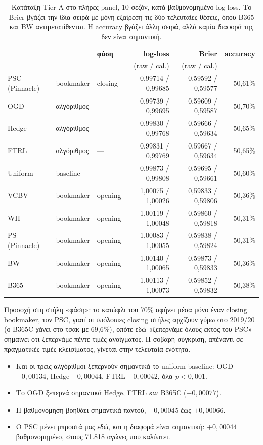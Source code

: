 \documentclass[11pt,a4paper]{article}
\renewcommand{\_}{\oldunderscore\allowbreak}
\begin{document}
\begin{table}[H]
\centering
\small
\begin{tabular}{@{}lllrrr@{}}
\toprule
& & \textbf{φάση} & \textbf{log-loss} & \textbf{Brier} & \textbf{accuracy} \\
& & & (raw / cal.) & (raw / cal.) & \\
\midrule
PSC (Pinnacle) & bookmaker & closing & 0,99714 / 0,99685 & 0,59592 / 0,59577 & 50,61\% \\
OGD            & αλγόριθμος & ---    & 0,99739 / 0,99695 & 0,59609 / 0,59587 & 50,70\% \\
Hedge          & αλγόριθμος & ---    & 0,99830 / 0,99768 & 0,59666 / 0,59634 & 50,65\% \\
FTRL           & αλγόριθμος & ---    & 0,99831 / 0,99769 & 0,59667 / 0,59634 & 50,65\% \\
Uniform        & baseline   & ---    & 0,99873 / 0,99808 & 0,59695 / 0,59661 & 50,60\% \\
VC\_BV         & bookmaker & opening & 1,00075 / 1,00026 & 0,59833 / 0,59806 & 50,36\% \\
WH             & bookmaker & opening & 1,00119 / 1,00048 & 0,59860 / 0,59818 & 50,31\% \\
PS (Pinnacle)  & bookmaker & opening & 1,00083 / 1,00055 & 0,59838 / 0,59824 & 50,31\% \\
BW             & bookmaker & opening & 1,00140 / 1,00065 & 0,59873 / 0,59833 & 50,36\% \\
B365           & bookmaker & opening & 1,00113 / 1,00073 & 0,59852 / 0,59832 & 50,38\% \\
\bottomrule
\end{tabular}
\caption{Κατάταξη Tier-A στο πλήρες panel, 10 σεζόν, κατά βαθμονομημένο log-loss. Το Brier
βγάζει την ίδια σειρά με μόνη εξαίρεση τις δύο τελευταίες θέσεις, όπου B365 και BW
αντιμετατίθενται. Η accuracy βγάζει άλλη σειρά, αλλά καμία διαφορά της δεν είναι σημαντική.}
\end{table}

Προσοχή στη στήλη «φάση»: το κατώφλι του 70\% αφήνει μέσα μόνο έναν closing bookmaker, τον
PSC, γιατί οι υπόλοιπες closing στήλες αρχίζουν γύρω στο 2019/20 (ο B365C χάνει στο τσακ με
69,6\%), οπότε εδώ «ξεπερνάμε όλους εκτός του PSC» σημαίνει ότι ξεπερνάμε πέντε τιμές
ανοίγματος. Η σοβαρή σύγκριση, απέναντι σε πραγματικές τιμές κλεισίματος, γίνεται στην
τελευταία ενότητα.

\begin{itemize}
  \item Και οι τρεις αλγόριθμοι ξεπερνούν σημαντικά το uniform baseline: OGD $-0{,}00134$,
        Hedge $-0{,}00044$, FTRL $-0{,}00042$, όλα $p<0{,}001$.
  \item Το OGD ξεπερνά σημαντικά Hedge, FTRL \emph{και} B365C ($-0{,}00077$).
  \item Η βαθμονόμηση βοηθάει σημαντικά παντού, $+0{,}00045$ έως $+0{,}00066$.
  \item Ο PSC μένει μπροστά μας εδώ, και η διαφορά είναι σημαντική: $+0{,}00044$
        βαθμονομημένο, στους 71.818 αγώνες που καλύπτει.
\end{itemize}
\end{document}

